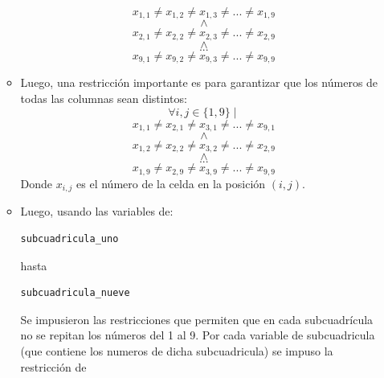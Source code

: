 \documentclass[12pt]{article}
\begin{document}
\begin{itemize}
\begin{itemize}
\begin{equation*}
x_{1,1} \neq x_{1,2} \neq x_{1,3} \neq ... \neq x_{1,9}
\end{equation*}
\begin{equation*}
\land
\end{equation*}
\begin{equation*}
x_{2,1} \neq x_{2,2} \neq x_{2,3} \neq ... \neq x_{2,9}
\end{equation*}
\begin{equation*}
\land
\end{equation*}
\begin{equation*}
...
\end{equation*}
\begin{equation*}
x_{9,1} \neq x_{9,2} \neq x_{9,3} \neq ... \neq x_{9,9}
\end{equation*}
\item Luego, una restricción importante es para garantizar que los números de todas las columnas sean distintos:
\begin{equation*}
\forall i,j \in \{1,9\} \mid
\end{equation*}
\begin{equation*}
x_{1,1} \neq x_{2,1} \neq x_{3,1} \neq ... \neq x_{9,1}
\end{equation*}
\begin{equation*}
\land
\end{equation*}
\begin{equation*}
x_{1,2} \neq x_{2,2} \neq x_{3,2} \neq ... \neq x_{2,9}
\end{equation*}
\begin{equation*}
\land
\end{equation*}
\begin{equation*}
...
\end{equation*}
\begin{equation*}
x_{1,9} \neq x_{2,9} \neq x_{3,9} \neq ... \neq x_{9,9}
\end{equation*}
Donde $x_{i,j}$ es el número de la celda en la posición $(i,j)$.
\item Luego, usando las variables de: \begin{verbatim}
subcuadricula_uno
\end{verbatim} hasta \begin{verbatim}
subcuadricula_nueve
\end{verbatim}
Se impusieron las restricciones que permiten que en cada subcuadrícula no se repitan los números del 1 al 9. Por cada variable de subcuadricula (que contiene los numeros de dicha subcuadricula) se impuso la restricción de \begin{verbatim}

\end{verbatim}
\end{itemize}
\end{itemize}
\end{document}
